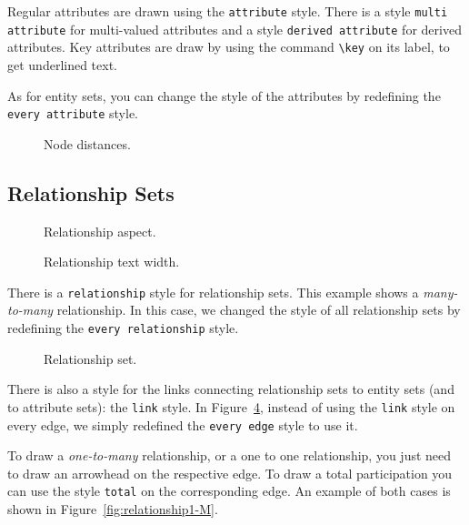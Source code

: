 \documentclass[12pt]{article}
\newcommand{\demo}[1]{
  \bigskip
  \begin{minipage}{\linewidth}
      \begin{center}
          
      \end{center}
      \begin{center}
          
      \end{center}
  \end{minipage}
}
\begin{document}
Regular attributes are drawn using the \texttt{attribute} style. There is a
style \texttt{multi attribute} for multi-valued attributes and a style
\texttt{derived attribute} for derived attributes. Key attributes are draw by
using the command \verb+\key+ on its label, to get underlined text.

As for entity sets, you can change the style of the attributes by redefining the
\texttt{every attribute} style.

\begin{figure}[htb!]
    \centering
    \demo{node-distances}
    \caption{Node distances.}
\label{fig:node-distances}
\end{figure}

%

\subsection{Relationship Sets}
\label{sec:relationships}

\begin{figure}[htb!]
    \centering
    \demo{relationship-aspect}
    \caption{Relationship aspect.}
\label{fig:relationship-aspect}
\end{figure}

\begin{figure}[htb!]
    \centering
    \demo{relationship-text-width}
    \caption{Relationship text width.}
\label{fig:relationship-text-width}
\end{figure}

There is a \texttt{relationship} style for relationship sets. This example
shows a \emph{many-to-many} relationship. In this case, we changed the style of
all relationship sets by redefining the \texttt{every relationship} style.

\begin{figure}[htb!]
    \centering
    \demo{relationshipM-M}
    \caption{Relationship set.}
\label{fig:relationship}
\end{figure}

There is also a style for the links connecting relationship sets to entity sets
(and to attribute sets): the \texttt{link} style. In
Figure~\ref{fig:relationship}, instead of using the \texttt{link} style on
every edge, we simply redefined the \texttt{every edge} style to use it.

To draw a \emph{one-to-many} relationship, or a one to one relationship, you
just need to draw an arrowhead on the respective edge. To draw a total
participation you can use the style \texttt{total} on the corresponding edge. An
example of both cases is shown in Figure~\ref{fig:relationship1-M}.
\end{document}
